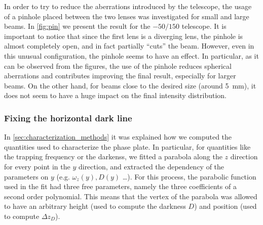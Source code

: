 In order to try to reduce the aberrations introduced by the telescope, the usage of a pinhole placed between the two lenses was investigated for small and large beams. In \cref{fig:pin} we present the result for the $-50/150$ telescope. It is important to notice that since the first lens is a diverging lens, the pinhole is almost completely open, and in fact partially \enquote{cuts} the beam. However, even in this unusual configuration, the pinhole seems to have an effect. In particular, as it can be observed from the figures, the use of the pinhole reduces spherical aberrations and contributes improving the final result, especially for larger beams. On the other hand, for beams close to the desired size (around \SI{5}{mm}), it does not seem to have a huge impact on the final intensity distribution.

\subsubsection{Fixing the horizontal dark line}
In \cref{sec:characterization_methods} it was explained how we computed the quantities used to characterize the phase plate. In particular, for quantities like the trapping frequency or the darkenss, we fitted a parabola along the $z$ direction for every point in the $y$ direction, and extracted the dependency of the parameters on $y$ (e.g. $\omega_z(y), D(y)$ \dots). For this process, the parabolic function used in the fit had three free parameters, namely the three coefficients of a second order polynomial. This means that the vertex of the parabola was allowed to have an arbitrary height (used to compute the darkness $D$) and position (used to compute $\Delta z_D$).

